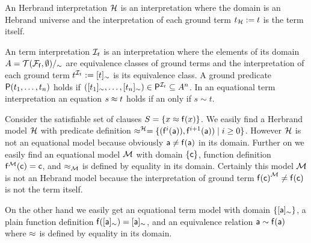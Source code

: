 \begin{definition}
	An {\myem Herbrand interpretation} ${\mathcal H}$ is an interpretation where the domain 
	is an Hebrand universe
	and the interpretation of each ground term $t_{\mathcal H} := t$ is the term itself.
\end{definition}

\begin{definition}
	An {\myem term interpretation} 
	${\mathcal I}_t$ 
	is an interpretation 
	where the elements of its domain $A = {{\mathcal T}({\mathcal F}_{\mathsf f},\emptyset)}/_\sim$ 
		are equivalence classes of ground terms
		and the interpretation of each ground term $t^{{\mathcal I}_t} := [t]_\sim$ is its equivalence class.
	 A ground predicate ${\mathsf P}(t_1,\ldots,t_n)$ holds if 
	 $([t_1]_\sim,\ldots,[t_n]_\sim) \in {\mathsf P}^{{\mathcal I}_t} \subseteq A^n$.
	In an {\myem equational} term interpretation an equation $s\approx t$ holds if an only if $s\sim t$.
	
\end{definition}

\begin{example}
	Consider the satisfiable set of clauses $S = \{ x \approx {\mathsf f}(x) \}$. 
%	
	We easily find a Herbrand model ${\mathcal H}$ with
	predicate definition $\approx^{\mathcal H} = \{ ({\mathsf f}^{i}({\mathsf a})), {\mathsf f}^{i+1}({\mathsf a})) \mid i\geq 0  \} $. 
	However ${\mathcal H}$ is not an equational model because obviously ${\mathsf a}\neq{\mathsf f}({\mathsf a})$ in its domain.
%	
	Further on we easily find an equational model ${\mathcal M}$ 
	with domain $\{ {\mathsf c} \}$, function definition ${\mathsf f}^{\mathcal M}({\mathsf c}) = {\mathsf c}$, 
	and $\approx_{\mathcal M}$ is defined by equality in its domain.
	Certainly this model ${\mathcal M}$ is not an Hebrand model 
	because the interpretation of ground term ${{\mathsf f}({\mathsf c})}^{\mathcal M} \neq {\mathsf f}({\mathsf c})$ is not the term itself.
	
	On the other hand we easily get an equational term model with domain $\{ [{\mathsf a}]_\sim\}$, 
	a plain function definition
	${\mathsf f}([{\mathsf a}]_\sim) = [{\mathsf a}]_\sim$, 
	and an equivalence relation
	${\mathsf a} \sim {\mathsf f}({\mathsf a})$
	where $\approx$ is defined by equality in its domain.	
\end{example}


